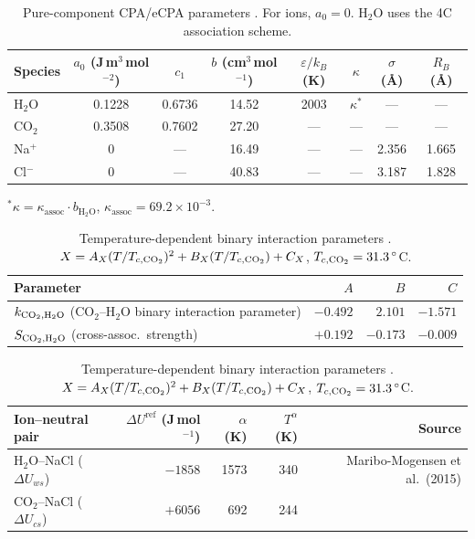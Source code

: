 \documentclass[preprint,12pt,number]{elsarticle}
\begin{document}
\begin{table}[H]
  \centering
  \caption{Pure-component CPA/eCPA parameters \citep{Coelho2025}.
           For ions, $a_0 = 0$. H$_2$O uses the 4C association scheme.}
  \label{tab:pure_params}
  \begin{tabular}{lccccccc}
    \toprule
    Species & $a_0$ (J\,m$^3$\,mol$^{-2}$) & $c_1$ & $b$ (cm$^3$\,mol$^{-1}$) &
              $\varepsilon/k_B$ (K) & $\kappa$ & $\sigma$ (\AA) & $R_B$ (\AA) \\
    \midrule
    H$_2$O & 0.1228 & 0.6736 & 14.52 & 2003 & $\kappa^*$ & ---   & ---   \\
    CO$_2$  & 0.3508 & 0.7602 & 27.20 & ---  & ---        & ---   & ---   \\
    Na$^+$  & 0      & ---    & 16.49 & ---  & ---        & 2.356 & 1.665 \\
    Cl$^-$  & 0      & ---    & 40.83 & ---  & ---        & 3.187 & 1.828 \\
    \bottomrule
  \end{tabular}
  \begin{flushleft}
    \footnotesize $^*\kappa = \kappa_{\text{assoc}} \cdot b_{\text{H}_2\text{O}}$,
    $\kappa_{\text{assoc}} = 69.2 \times 10^{-3}$.
  \end{flushleft}
\end{table}

\begin{table}[H]
  \centering
  \caption{Temperature-dependent binary interaction parameters \citep{Coelho2025}.
           $X = A_X(T/T_{c,{\rm CO_2}})^2 + B_X(T/T_{c,{\rm CO_2}}) + C_X$, $T_{c,{\rm CO_2}} = 31.3\,^\circ$C.}
  \label{tab:binary_params}
  \begin{tabular}{lrrr}
    \toprule
    Parameter & $A$ & $B$ & $C$ \\
    \midrule
    $k_{{\rm CO_2},{\rm H_2O}}$ (CO$_2$--H$_2$O binary interaction parameter) & $-0.492$ & $2.101$ & $-1.571$ \\
    $S_{{\rm CO_2},{\rm H_2O}}$ (cross-assoc.\ strength) & $+0.192$ & $-0.173$ & $-0.009$ \\
    \bottomrule
  \end{tabular}

  \vspace{6pt}
  \begin{tabular}{lrrrr}
    \toprule
    Ion--neutral pair & $\Delta U^{\text{ref}}$ (J\,mol$^{-1}$) & $\alpha$ (K) & $T^\alpha$ (K) & Source \\
    \midrule
    H$_2$O--NaCl ($\Delta U_{ws}$) & $-1858$ & 1573 & 340 & Maribo-Mogensen et al.\ (2015) \\
    CO$_2$--NaCl ($\Delta U_{cs}$) & $+6056$ & 692  & 244 & \citet{Coelho2025} \\
    \bottomrule
  \end{tabular}
\end{table}
\end{document}
